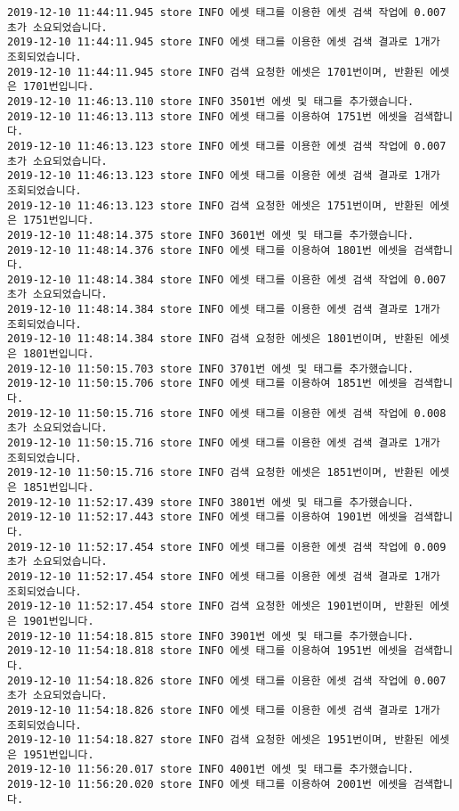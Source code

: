 \begin{Verbatim}[fontsize=\tiny, breaklines=true, breakanywhere=true]
2019-12-10 11:44:11.945 store INFO 에셋 태그를 이용한 에셋 검색 작업에 0.007초가 소요되었습니다.
2019-12-10 11:44:11.945 store INFO 에셋 태그를 이용한 에셋 검색 결과로 1개가 조회되었습니다.
2019-12-10 11:44:11.945 store INFO 검색 요청한 에셋은 1701번이며, 반환된 에셋은 1701번입니다.
2019-12-10 11:46:13.110 store INFO 3501번 에셋 및 태그를 추가했습니다.
2019-12-10 11:46:13.113 store INFO 에셋 태그를 이용하여 1751번 에셋을 검색합니다.
2019-12-10 11:46:13.123 store INFO 에셋 태그를 이용한 에셋 검색 작업에 0.007초가 소요되었습니다.
2019-12-10 11:46:13.123 store INFO 에셋 태그를 이용한 에셋 검색 결과로 1개가 조회되었습니다.
2019-12-10 11:46:13.123 store INFO 검색 요청한 에셋은 1751번이며, 반환된 에셋은 1751번입니다.
2019-12-10 11:48:14.375 store INFO 3601번 에셋 및 태그를 추가했습니다.
2019-12-10 11:48:14.376 store INFO 에셋 태그를 이용하여 1801번 에셋을 검색합니다.
2019-12-10 11:48:14.384 store INFO 에셋 태그를 이용한 에셋 검색 작업에 0.007초가 소요되었습니다.
2019-12-10 11:48:14.384 store INFO 에셋 태그를 이용한 에셋 검색 결과로 1개가 조회되었습니다.
2019-12-10 11:48:14.384 store INFO 검색 요청한 에셋은 1801번이며, 반환된 에셋은 1801번입니다.
2019-12-10 11:50:15.703 store INFO 3701번 에셋 및 태그를 추가했습니다.
2019-12-10 11:50:15.706 store INFO 에셋 태그를 이용하여 1851번 에셋을 검색합니다.
2019-12-10 11:50:15.716 store INFO 에셋 태그를 이용한 에셋 검색 작업에 0.008초가 소요되었습니다.
2019-12-10 11:50:15.716 store INFO 에셋 태그를 이용한 에셋 검색 결과로 1개가 조회되었습니다.
2019-12-10 11:50:15.716 store INFO 검색 요청한 에셋은 1851번이며, 반환된 에셋은 1851번입니다.
2019-12-10 11:52:17.439 store INFO 3801번 에셋 및 태그를 추가했습니다.
2019-12-10 11:52:17.443 store INFO 에셋 태그를 이용하여 1901번 에셋을 검색합니다.
2019-12-10 11:52:17.454 store INFO 에셋 태그를 이용한 에셋 검색 작업에 0.009초가 소요되었습니다.
2019-12-10 11:52:17.454 store INFO 에셋 태그를 이용한 에셋 검색 결과로 1개가 조회되었습니다.
2019-12-10 11:52:17.454 store INFO 검색 요청한 에셋은 1901번이며, 반환된 에셋은 1901번입니다.
2019-12-10 11:54:18.815 store INFO 3901번 에셋 및 태그를 추가했습니다.
2019-12-10 11:54:18.818 store INFO 에셋 태그를 이용하여 1951번 에셋을 검색합니다.
2019-12-10 11:54:18.826 store INFO 에셋 태그를 이용한 에셋 검색 작업에 0.007초가 소요되었습니다.
2019-12-10 11:54:18.826 store INFO 에셋 태그를 이용한 에셋 검색 결과로 1개가 조회되었습니다.
2019-12-10 11:54:18.827 store INFO 검색 요청한 에셋은 1951번이며, 반환된 에셋은 1951번입니다.
2019-12-10 11:56:20.017 store INFO 4001번 에셋 및 태그를 추가했습니다.
2019-12-10 11:56:20.020 store INFO 에셋 태그를 이용하여 2001번 에셋을 검색합니다.

\end{Verbatim}
